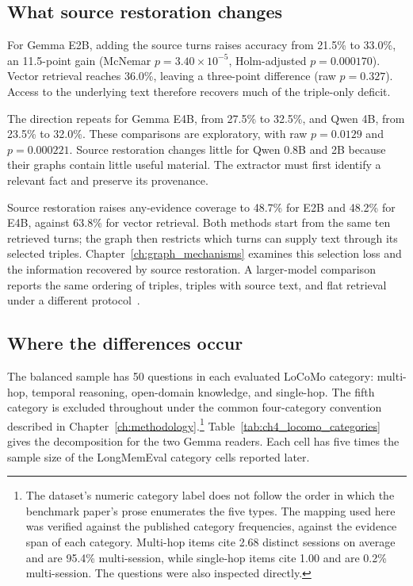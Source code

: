 \subsection{What source restoration changes}
\label{sec:ch4_source_restoration}

For Gemma E2B, adding the source turns raises accuracy from 21.5\% to 33.0\%, an 11.5-point gain
(McNemar $p=3.40\times10^{-5}$, Holm-adjusted $p=0.000170$). Vector retrieval reaches 36.0\%, leaving a three-point difference
(raw $p=0.327$). Access to the underlying text therefore recovers much of the triple-only deficit.

The direction repeats for Gemma E4B, from 27.5\% to 32.5\%, and Qwen 4B, from 23.5\% to 32.0\%.
These comparisons are exploratory, with raw $p=0.0129$ and $p=0.000221$. Source restoration changes
little for Qwen 0.8B and 2B because their graphs contain little useful material. The extractor must
first identify a relevant fact and preserve its provenance.

Source restoration raises any-evidence coverage to 48.7\% for E2B and 48.2\% for E4B,
against 63.8\% for vector retrieval. Both methods start from the same ten retrieved turns;
the graph then restricts which turns can supply text through its selected triples.
Chapter~\ref{ch:graph_mechanisms} examines this selection loss and the information recovered
by source restoration. A larger-model comparison reports the same ordering
of triples, triples with source text, and flat retrieval under a different
protocol~\citep{rag_vs_graphrag}.

\subsection{Where the differences occur}
\label{sec:ch4_locomo_categories}

The balanced sample has 50 questions in each evaluated LoCoMo category: multi-hop, temporal
reasoning, open-domain knowledge, and single-hop. The fifth category is excluded throughout under
the common four-category convention described in
Chapter~\ref{ch:methodology}.\footnote{The dataset's numeric category label does not follow the order
in which the benchmark paper's prose enumerates the five types. The
mapping used here was verified against the published category frequencies, against the evidence
span of each category. Multi-hop items cite 2.68 distinct sessions on average and are 95.4\%
multi-session, while single-hop items cite 1.00 and are 0.2\% multi-session. The questions were also
inspected directly.} Table~\ref{tab:ch4_locomo_categories} gives the decomposition for the two
Gemma readers. Each cell has five times the sample size of the LongMemEval category cells reported
later.

